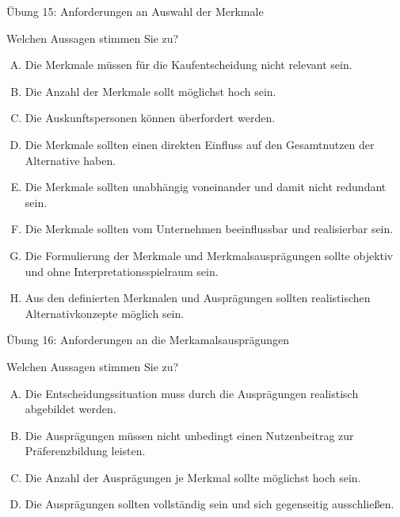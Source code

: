 \documentclass[12pt,ngerman,a4paper,ignorenonframetext,]{beamer}
\providecommand{\tightlist}{%
  \setlength{\itemsep}{0pt}\setlength{\parskip}{0pt}}
\begin{document}
\begin{frame}{Übung 15: Anforderungen an Auswahl der Merkmale}
\protect\hypertarget{ubung-15-anforderungen-an-auswahl-der-merkmale}{}

Welchen Aussagen stimmen Sie zu?

\begin{enumerate}
[A.]
\tightlist
\item
  Die Merkmale müssen für die Kaufentscheidung nicht relevant sein.
\item
  Die Anzahl der Merkmale sollt möglichst hoch sein.
\item
  Die Auskunftspersonen können überfordert werden.
\item
  Die Merkmale sollten einen direkten Einfluss auf den Gesamtnutzen der
  Alternative haben.
\item
  Die Merkmale sollten unabhängig voneinander und damit nicht redundant
  sein.
\item
  Die Merkmale sollten vom Unternehmen beeinflussbar und realisierbar
  sein.
\item
  Die Formulierung der Merkmale und Merkmalsausprägungen sollte objektiv
  und ohne Interpretationsspielraum sein.
\item
  Aus den definierten Merkmalen und Ausprägungen sollten realistischen
  Alternativkonzepte möglich sein.
\end{enumerate}


\end{frame}

\begin{frame}{Übung 16: Anforderungen an die Merkamalsausprägungen}
\protect\hypertarget{ubung-16-anforderungen-an-die-merkamalsauspragungen}{}

Welchen Aussagen stimmen Sie zu?

\begin{enumerate}
[A.]
\tightlist
\item
  Die Entscheidungssituation muss durch die Ausprägungen realistisch
  abgebildet werden.
\item
  Die Ausprägungen müssen nicht unbedingt einen Nutzenbeitrag zur
  Präferenzbildung leisten.
\item
  Die Anzahl der Ausprägungen je Merkmal sollte möglichst hoch sein.
\item
  Die Ausprägungen sollten vollständig sein und sich gegenseitig
  ausschließen.
\end{enumerate}


\end{frame}
\end{document}
